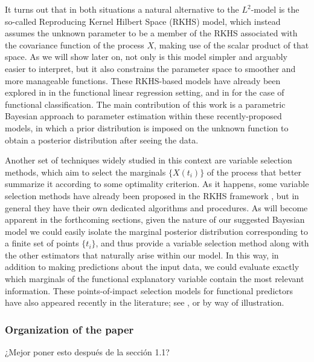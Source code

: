 \documentclass[ba]{imsart}
\numberwithin{equation}{section}
\theoremstyle{plain}
\newenvironment{comment}
{
\noindent \em \color{red}
}
{
\color{black}
}
\begin{document}
It turns out that in both situations a natural alternative to the \(L^2\)-model is the so-called Reproducing Kernel Hilbert Space (RKHS) model, which instead assumes the unknown parameter to be a member of the RKHS associated with the covariance function of the process \(X\), making use of the scalar product of that space. As we will show later on, not only is this model simpler and arguably easier to interpret, but it also constrains the parameter space to smoother and more manageable functions. These RKHS-based models have already been explored in \citet{berrendero2020general} in the functional linear regression setting, and in \citet{berrendero2018use} for the case of functional classification. The main contribution of this work is a parametric Bayesian approach to parameter estimation within these recently-proposed models, in which a prior distribution is imposed on the unknown function to  obtain a posterior distribution after seeing the data.

Another set of techniques widely studied in this context are variable selection methods, which aim to select the marginals \(\{X(t_i)\}\) of the process that better summarize it according to some optimality criterion. As it happens, some variable selection methods have already been proposed in the RKHS framework \citep[see for example][]{berrendero2019rkhs}, but in general they have their own dedicated algorithms and procedures. As will become apparent in the forthcoming sections, given the nature of our suggested Bayesian model we could easily isolate the marginal posterior distribution corresponding to a finite set of points \(\{t_i\}\), and thus provide a variable selection method along with the other estimators that naturally arise within our model. In this way, in addition to making predictions about the input data, we could evaluate exactly which marginals of the functional explanatory variable contain the most relevant information. These points-of-impact selection models for functional predictors have also appeared recently in the literature; see \citet{poss2020superconsistent}, \citet{berrendero2016variable} or \citet{ferraty2010most} by way of illustration.

\subsubsection{Organization of the paper}

\begin{comment}
¿Mejor poner esto después de la sección 1.1?
\end{comment}
\end{document}
